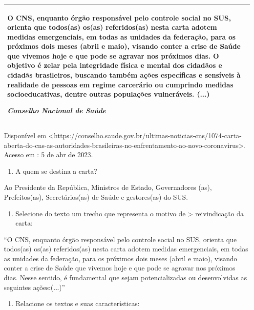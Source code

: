 {\begin{longtable}[]{@{}
  >{\raggedright\arraybackslash}p{}@{}}
O CNS, enquanto órgão responsável pelo controle social no SUS, orienta
que todos(as) os(as) referidos(as) nesta carta adotem medidas
emergenciais, em todas as unidades da federação, para os próximos dois
meses (abril e maio), visando conter a crise de Saúde que vivemos hoje e
que pode se agravar nos próximos dias. O objetivo é zelar pela
integridade física e mental dos cidadãos e cidadãs brasileiros, buscando
também ações específicas e sensíveis à realidade de pessoas em regime
carcerário ou cumprindo medidas socioeducativas, dentre outras
populações vulneráveis. (...)

\emph{Conselho Nacional de Saúde} \\
\bottomrule
\end{longtable}

Disponível em
\textless https://conselho.saude.gov.br/ultimas-noticias-cns/1074-carta-aberta-do-cns-as-autoridades-brasileiras-no-enfrentamento-ao-novo-coronavirus\textgreater.
Acesso em : 5 de abr de 2023.

\begin{enumerate}
\def\labelenumi{\arabic{enumi})}
\setcounter{enumi}{7}
\tightlist
\item
  A quem se destina a carta?
\end{enumerate}

Ao Presidente da República, Ministros de Estado, Governadores (as),
Prefeitos(as), Secretários(as) de Saúde e gestores(as) do SUS.

\begin{enumerate}
\def\labelenumi{\arabic{enumi})}
\setcounter{enumi}{8}
\tightlist
\item
  Selecione do texto um trecho que representa o motivo de \textgreater{}
  reivindicação da carta:
\end{enumerate}

``O CNS, enquanto órgão responsável pelo controle social no SUS, orienta
que todos(as) os(as) referidos(as) nesta carta adotem medidas
emergenciais, em todas as unidades da federação, para os próximos dois
meses (abril e maio), visando conter a crise de Saúde que vivemos hoje e
que pode se agravar nos próximos dias. Nesse sentido, é fundamental que
sejam potencializadas ou desenvolvidas as seguintes ações:(...)''

\begin{enumerate}
\def\labelenumi{\arabic{enumi})}
\setcounter{enumi}{9}
\tightlist
\item
  Relacione os textos e suas características:
\end{enumerate}

}
